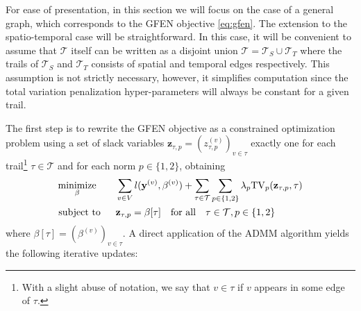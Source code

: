 \documentclass[a4paper, 11pt]{article}
\begin{document}
 For ease of presentation, in this section we will focus on the case of a general graph, which corresponds to the GFEN objective \ref{eq:gfen}. The extension to the spatio-temporal case will be straightforward. In this case, it will be convenient to assume that $\mathcal{T}$ itself can be written as a disjoint union $\mathcal{T} = \mathcal{T}_S \cup \mathcal{T}_T$ where the trails of $\mathcal{T}_S$ and $\mathcal{T}_T$ consists of spatial and temporal edges respectively. This assumption is not strictly necessary, however, it simplifies computation since the total variation penalization hyper-parameters will always be constant for a given trail.
 
The first step is to rewrite the GFEN objective as a constrained optimization problem using a set of slack variables $\mathbf{z}_{\tau, p} = (z^{(v)}_{\tau, p})_{v\in \tau}$ exactly one for each trail\footnote{With a slight abuse of notation, we say that $v\in \tau$ if $v$ appears in some edge of $\tau$.} $\tau \in \mathcal{T}$ and for each norm $p\in\{1,2\}$, obtaining
\begin{equation}\label{eq:gfen-constrained}
\begin{aligned}
\operatornamewithlimits{minimize}_{\beta} \quad\quad & \sum_{v \in V} l(\mathbf{y}^{(v)}, \beta^{(v)}) + \sum_{\tau \in \mathcal{T}}  \sum_{p \in \{1,2\}} \lambda_p \mathrm{TV}_p(\mathbf{z}_{\tau, p}, \tau) \\ 
\text{subject to} \quad\;\; & \mathbf{z}_{\tau, p} = \beta[\tau] \quad\text{for all}\quad \tau \in \mathcal{T}, p \in \{1,2\}
\end{aligned}
\end{equation}
where $\beta[\tau] =  (\beta^{(v)})_{v\in \tau}$. A direct application of the ADMM algorithm \citep{boyd2011distributed} yields the following iterative updates:
\end{document}
